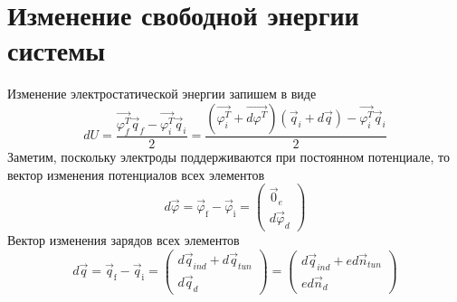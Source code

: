 \documentclass[12pt,a4paper]{scrartcl}
\begin{document}
\section{Изменение свободной энергии системы}

Изменение электростатической энергии запишем в виде
\begin{equation}
  dU = 
  \frac{\vec{\varphi_{f}^T}\vec{q}_{f}-\vec{\varphi_{i}^T}\vec{q}_{i}}{2}=
  \frac{(\vec{\varphi_{i}^T}+\vec{d\varphi^T})
  (\vec{q}_{i}+d\vec{q})
  -\vec{\varphi_{i}^T}\vec{q}_{i}}{2}
\end{equation}
Заметим, поскольку электроды поддерживаются при постоянном потенциале, то 
вектор изменения потенциалов всех элементов 
\begin{equation}
  d\vec{\varphi}=
  \vec{\varphi}_{\mbox{f}}-\vec{\varphi}_{\mbox{i}}=
  \left(
  \begin{array}{c}
   \vec 0_e\\
   d\vec \varphi_d
  \end{array}
  \right)
\end{equation}
Вектор изменения зарядов всех элементов 
\begin{equation}
  d\vec{q}=
  \vec{q}_{\mbox{f}}-\vec{q}_{\mbox{i}}=
  \left(
  \begin{array}{c}
   d\vec q_{ind}+d\vec q_{tun}\\
   d\vec q_d
  \end{array}
  \right)=
  \left(
  \begin{array}{c}
   d\vec q_{ind}+ed\vec n_{tun}\\
   ed\vec n_d
  \end{array}
  \right)
\end{equation}
\end{document}
